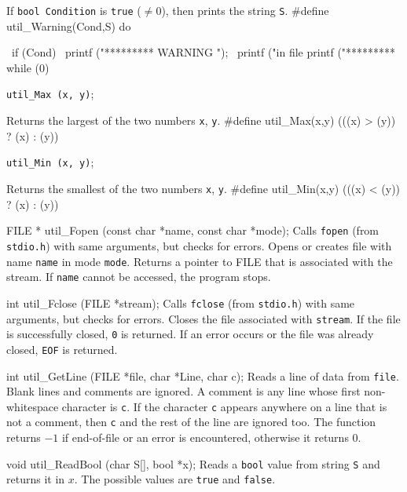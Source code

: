  \tab  If {\tt bool Condition} is {\tt true} ($\not = 0$),
 then prints the string {\tt S}.
 \endtab
\code
\hide
#define util_Warning(Cond,S) do { \
   if (Cond) { \
      printf ("*********  WARNING "); \
      printf ("in file  %
      printf ("*********  %
   } while (0)
\endhide
\endcode


\noindent
{\tt util\_Max (x, y)};

 \tab  Returns the largest of the two numbers {\tt  x}, {\tt y}.
 \endtab
\code
\hide
#define util_Max(x,y) (((x) > (y)) ? (x) : (y))
\endhide
\endcode


\noindent
{\tt util\_Min (x, y)};

 \tab  Returns the smallest of the two numbers {\tt  x}, {\tt y}.
 \endtab
\code
\hide
#define util_Min(x,y) (((x) < (y)) ? (x) : (y))
\endhide
\endcode



\code

FILE * util_Fopen (const char *name, const char *mode);
\endcode
  \tab
  Calls {\tt fopen} (from {\tt stdio.h}) with same arguments, but checks
  for errors.
  Opens or creates file with name {\tt name} in mode {\tt mode}. Returns a
  pointer to
  FILE that is associated with the stream. If {\tt name} cannot be accessed,
  the program
  stops.
 \endtab
\code


int util_Fclose (FILE *stream);
\endcode
  \tab
   Calls {\tt fclose} (from {\tt stdio.h}) with same arguments, but checks
   for errors.
   Closes the file associated with {\tt stream}. If the file is successfully
   closed, {\tt 0}
   is returned. If an error occurs or the file was already closed, {\tt EOF}
   is returned.
 \endtab
\code


int util_GetLine (FILE *file, char *Line, char c);
\endcode
  \tab
  Reads a line of data from {\tt file}. Blank lines and comments are
  ignored. A comment is any line whose first non-whitespace character
  is {\tt c}. If the character {\tt c} appears anywhere on a line that is
  not a comment, then  {\tt c} and the rest of the line are ignored too.
  The function returns $-1$ if end-of-file or an error is encountered,
  otherwise it returns 0.
  \endtab
\code


void util_ReadBool (char S[], bool *x);
\endcode
  \tab
  Reads a {\tt bool} value from string {\tt S} and returns it in  $x$.
  The possible values are  {\tt true} and  {\tt false}.
  \endtab
\code


}
